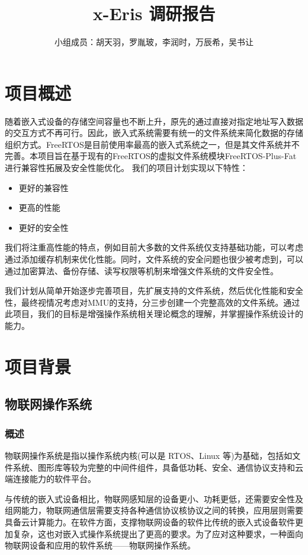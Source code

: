 \documentclass[UTF8,a4paper]{ctexart}
\title{\textbf{x-Eris 调研报告}}
\author{小组成员：胡天羽，罗胤玻，李润时，万辰希，吴书让}
\begin{document}
\maketitle

\section{项目概述}
随着嵌入式设备的存储空间容量也不断上升，原先的通过直接对指定地址写入数据的交互方式不再可行。因此，嵌入式系统需要有统一的文件系统来简化数据的存储组织方式。FreeRTOS是目前使用率最高的嵌入式系统之一，但是其文件系统并不完善。本项目旨在基于现有的FreeRTOS的虚拟文件系统模块FreeRTOS-Plus-Fat进行兼容性拓展及安全性能优化。
我们的项目计划实现以下特性：
\begin{itemize}
    \item 更好的兼容性
    \item 更高的性能
    \item 更好的安全性
\end{itemize}

我们将注重高性能的特点，例如目前大多数的文件系统仅支持基础功能，可以考虑通过添加缓存机制来优化性能。同时，文件系统的安全问题也很少被考虑到，可以通过加密算法、备份存储、读写权限等机制来增强文件系统的文件安全性。

我们计划从简单开始逐步完善项目，先扩展支持的文件系统，然后优化性能和安全性，最终视情况考虑对MMU的支持，分三步创建一个完整高效的文件系统。通过此项目，我们的目标是增强操作系统相关理论概念的理解，并掌握操作系统设计的能力。

\section{项目背景}
\subsection{物联网操作系统}
\subsubsection{概述}
物联网操作系统是指以操作系统内核(可以是 RTOS、Linux 等)为基础，包括如文件系统、图形库等较为完整的中间件组件，具备低功耗、安全、通信协议支持和云端连接能力的软件平台。

与传统的嵌入式设备相比，物联网感知层的设备更小、功耗更低，还需要安全性及组网能力，物联网通信层需要支持各种通信协议核协议之间的转换，应用层则需要具备云计算能力。在软件方面，支撑物联网设备的软件比传统的嵌入式设备软件更加复杂，这也对嵌入式操作系统提出了更高的要求。为了应对这种要求，一种面向物联网设备和应用的软件系统——物联网操作系统。
\end{document}
